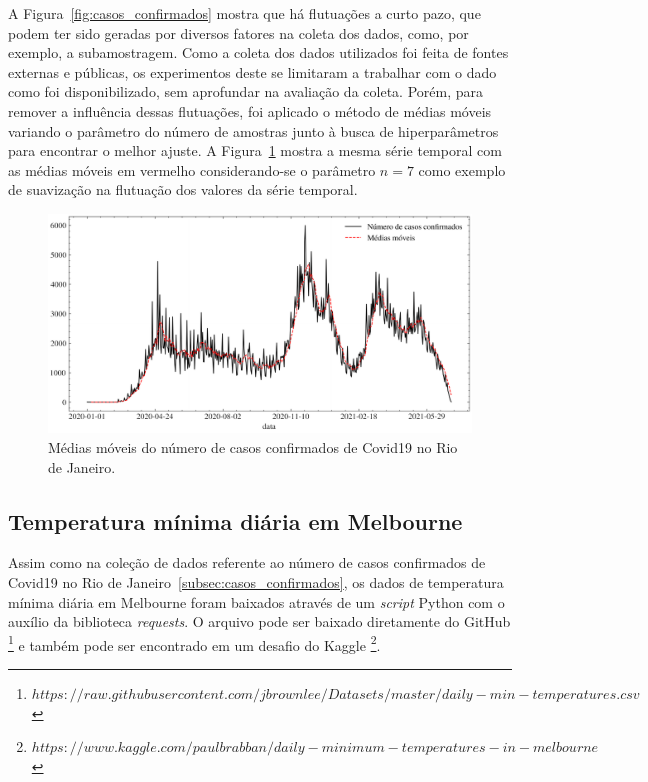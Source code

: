 A Figura~\ref{fig:casos_confirmados} mostra que há flutuações a curto pazo, que podem ter sido geradas por diversos fatores na coleta dos dados, como, por exemplo, a subamostragem. Como a coleta dos dados utilizados foi feita de fontes externas e públicas, os experimentos deste se limitaram a trabalhar com o dado como foi disponibilizado, sem aprofundar na avaliação da coleta. Porém, para remover a influência dessas flutuações, foi aplicado o método de médias móveis variando o parâmetro do número de amostras junto à busca de hiperparâmetros para encontrar o melhor ajuste. A Figura~\ref{fig:casos_confirmados_ma} mostra a mesma série temporal com as médias móveis em vermelho considerando-se o parâmetro $n=7$ como exemplo de suavização na flutuação dos valores da série temporal.

\begin{figure}[!htp]
    \centering
    \includegraphics[width=5.0in]{img/casos_confirmados_ma.pdf}
    \caption{Médias móveis do número de casos confirmados de Covid19 no Rio de Janeiro.}
    \label{fig:casos_confirmados_ma}
\end{figure}

\FloatBarrier

\subsection{Temperatura mínima diária em Melbourne}
Assim como na coleção de dados referente ao número de casos confirmados de Covid19 no Rio de Janeiro~\ref{subsec:casos_confirmados}, os dados de temperatura mínima diária em Melbourne foram baixados através de um \textit{script} Python com o auxílio da biblioteca \textit{requests}. O arquivo pode ser baixado diretamente do GitHub \footnote{$https://raw.githubusercontent.com/jbrownlee/Datasets/master/daily-min-temperatures.csv$} e também pode ser encontrado em um desafio do Kaggle \footnote{$https://www.kaggle.com/paulbrabban/daily-minimum-temperatures-in-melbourne$}.

